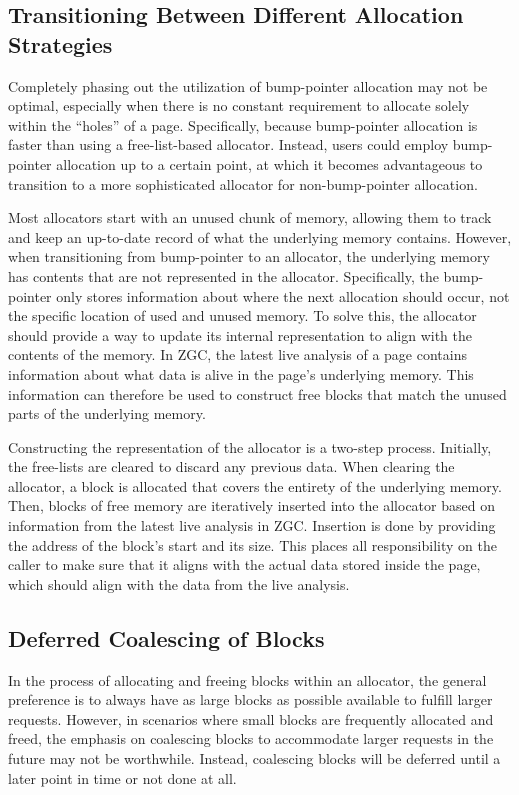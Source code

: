 \subsection{Transitioning Between Different Allocation Strategies}

Completely phasing out the utilization of bump-pointer allocation may not be optimal, especially when there is no constant requirement to allocate solely within the ``holes'' of a page. Specifically, because bump-pointer allocation is faster than using a free-list-based allocator. Instead, users could employ bump-pointer allocation up to a certain point, at which it becomes advantageous to transition to a more sophisticated allocator for non-bump-pointer allocation.

Most allocators start with an unused chunk of memory, allowing them to track and keep an up-to-date record of what the underlying memory contains. However, when transitioning from bump-pointer to an allocator, the underlying memory has contents that are not represented in the allocator. Specifically, the bump-pointer only stores information about where the next allocation should occur, not the specific location of used and unused memory. To solve this, the allocator should provide a way to update its internal representation to align with the contents of the memory. In ZGC, the latest live analysis of a page contains information about what data is alive in the page's underlying memory. This information can therefore be used to construct free blocks that match the unused parts of the underlying memory.

Constructing the representation of the allocator is a two-step process. Initially, the free-lists are cleared to discard any previous data. When clearing the allocator, a block is allocated that covers the entirety of the underlying memory. Then, blocks of free memory are iteratively inserted into the allocator based on information from the latest live analysis in ZGC. Insertion is done by providing the address of the block's start and its size. This places all responsibility on the caller to make sure that it aligns with the actual data stored inside the page, which should align with the data from the live analysis.

\subsection{Deferred Coalescing of Blocks}

In the process of allocating and freeing blocks within an allocator, the general preference is to always have as large blocks as possible available to fulfill larger requests. However, in scenarios where small blocks are frequently allocated and freed, the emphasis on coalescing blocks to accommodate larger requests in the future may not be worthwhile. Instead, coalescing blocks will be deferred until a later point in time or not done at all.

